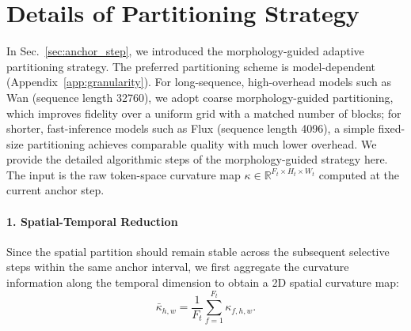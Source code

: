 

\section{Details of Partitioning Strategy}
\label{app:parition}

In Sec.~\ref{sec:anchor_step}, we introduced the morphology-guided adaptive partitioning strategy. The preferred partitioning scheme is model-dependent (Appendix~\ref{app:granularity}). For long-sequence, high-overhead models such as Wan (sequence length 32760), we adopt coarse morphology-guided partitioning, which improves fidelity over a uniform grid with a matched number of blocks; for shorter, fast-inference models such as Flux (sequence length 4096), a simple fixed-size partitioning achieves comparable quality with much lower overhead. We provide the detailed algorithmic steps of the morphology-guided strategy here. The input is the raw token-space curvature map $\kappa \in \mathbb{R}^{F_t \times H_t \times W_t}$ computed at the current anchor step.

\paragraph{1. Spatial-Temporal Reduction}
Since the spatial partition should remain stable across the subsequent selective steps within the same anchor interval, we first aggregate the curvature information along the temporal dimension to obtain a 2D spatial curvature map:
\begin{equation}
    \bar{\kappa}_{h,w} = \frac{1}{F_t}\sum_{f=1}^{F_t}\kappa_{f,h,w}.
\end{equation}

